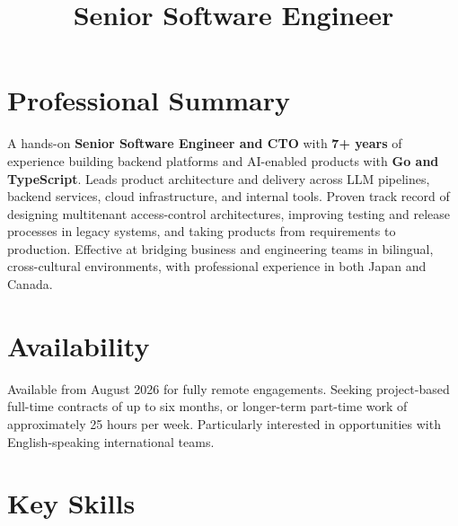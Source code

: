 \documentclass[11pt,letterpaper]{moderncv}
\title{Senior Software Engineer}
\begin{document}
\makecvtitle

\section{Professional Summary}
A hands-on \textbf{Senior Software Engineer and CTO} with \textbf{7+ years} of experience building backend platforms and AI-enabled products with \textbf{Go and TypeScript}.
Leads product architecture and delivery across LLM pipelines, backend services, cloud infrastructure, and internal tools.
Proven track record of designing multitenant access-control architectures, improving testing and release processes in legacy systems, and taking products from requirements to production.
Effective at bridging business and engineering teams in bilingual, cross-cultural environments, with professional experience in both Japan and Canada.

\section{Availability}
Available from August 2026 for fully remote engagements.
Seeking project-based full-time contracts of up to six months, or longer-term part-time work of approximately 25 hours per week.
Particularly interested in opportunities with English-speaking international teams.

\section{Key Skills}
\end{document}
